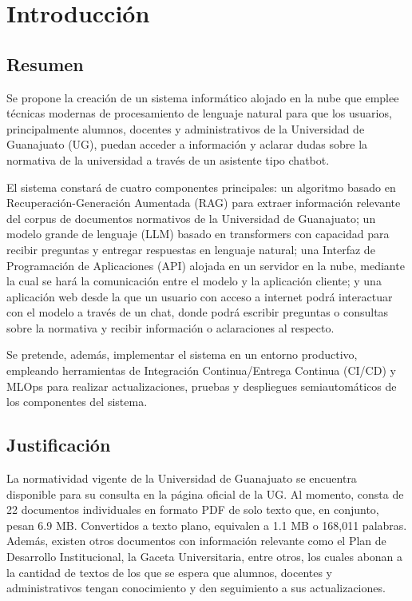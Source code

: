 \chapter{Introducción}

\section{Resumen}

Se propone la creación de un sistema informático alojado en la nube que emplee
técnicas modernas de procesamiento de lenguaje natural para que los usuarios,
principalmente alumnos, docentes y administrativos de la Universidad de Guanajuato
(UG), puedan acceder a información y aclarar dudas sobre la normativa de la
universidad a través de un asistente tipo chatbot.

El sistema constará de cuatro componentes principales: un algoritmo basado en
Recuperación-Generación Aumentada (RAG) para extraer información relevante del
corpus de documentos normativos de la Universidad de Guanajuato; un modelo
grande de lenguaje (LLM) basado en transformers con capacidad para recibir
preguntas y entregar respuestas en lenguaje natural; una Interfaz de Programación
de Aplicaciones (API) alojada en un servidor en la nube, mediante la cual se hará
la comunicación entre el modelo y la aplicación cliente; y una aplicación web
desde la que un usuario con acceso a internet podrá interactuar con el modelo a
través de un chat, donde podrá escribir preguntas o consultas sobre la normativa
y recibir información o aclaraciones al respecto.

Se pretende, además, implementar el sistema en un entorno productivo, empleando
herramientas de Integración Continua/Entrega Continua (CI/CD) y MLOps para realizar
actualizaciones, pruebas y despliegues semiautomáticos de los componentes del sistema.

\section{Justificación}

La normatividad vigente de la Universidad de Guanajuato se encuentra disponible
para su consulta en la página oficial de la UG. Al momento, consta de 22 documentos
individuales en formato PDF de solo texto que, en conjunto, pesan 6.9 MB. Convertidos
a texto plano, equivalen a 1.1 MB o 168,011 palabras. Además, existen otros
documentos con información relevante como el Plan de Desarrollo Institucional,
la Gaceta Universitaria, entre otros, los cuales abonan a la cantidad de textos
de los que se espera que alumnos, docentes y administrativos tengan conocimiento
y den seguimiento a sus actualizaciones.


